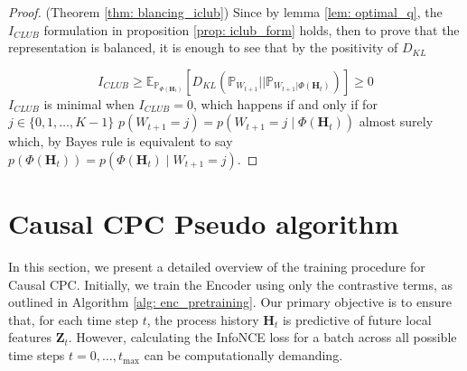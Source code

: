 \documentclass{article}
\theoremstyle{plain}
\theoremstyle{definition}
\theoremstyle{remark}
\begin{document}
\begin{proof}(Theorem \ref{thm: blancing_iclub})
Since by lemma \ref{lem: optimal_q}, the $I_{CLUB}$ formulation in  proposition \ref{prop: iclub_form} holds, then to prove that the representation is balanced, it is enough to see that by the positivity of $D_{KL}$

\begin{equation}
    I_{CLUB} \geq  \mathbb{E}_{\mathbb{P}_{\Phi(\mathbf{H}_t)}}\left[ D_{KL}(\mathbb{P}_{W_{t+1}}||\mathbb{P}_{W_{t+1}|\Phi(\mathbf{H}_t)} )\right] \geq 0  
    \label{eq: iclub_ineq_at_optimal}
\end{equation}
$I_{CLUB}$ is minimal when $I_{CLUB} =0$, which happens if and only if for $j \in \{0,1,\dots, K-1\}$  $p(W_{t+1} =j ) = p(W_{t+1} =j \mid \Phi(\mathbf{H}_t))$ almost surely which, by Bayes rule is equivalent to say $p(\Phi(\mathbf{H}_t)) = p(\Phi(\mathbf{H}_t) \mid W_{t+1} =j) $.


        
    
\end{proof}
\section{Causal CPC Pseudo algorithm}
\label{sect: alg_ccpc}
In this section, we present a detailed overview of the training procedure for Causal CPC. Initially, we train the Encoder using only the contrastive terms, as outlined in Algorithm \ref{alg: enc_pretraining}. Our primary objective is to ensure that, for each time step $t$, the process history $\mathbf{H}_{t}$ is predictive of future local features $\mathbf{Z}_t$. However, calculating the InfoNCE loss for a batch across all possible time steps $t=0, \dots, t_{\text{max}}$ can be computationally demanding.
\end{document}
